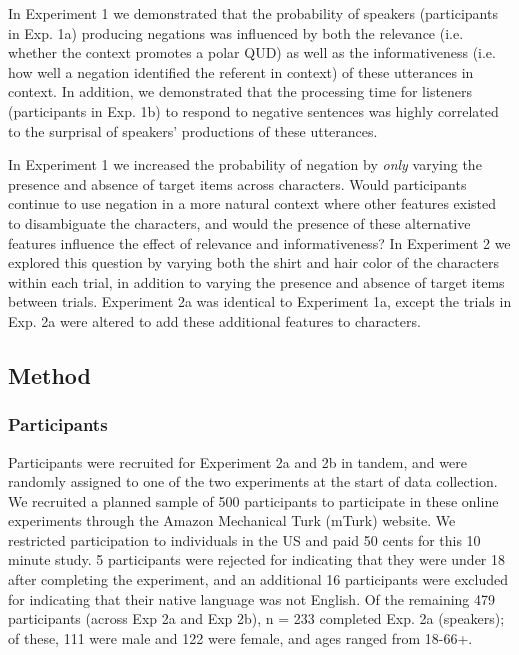 \documentclass[man, floatsintext, noapacite]{apa6}
\begin{document}
In Experiment 1 we demonstrated that the probability of speakers (participants in Exp. 1a) producing negations was influenced by both the relevance (i.e. whether the context promotes a polar QUD) as well as the informativeness (i.e. how well a negation identified the referent in context) of these utterances in context. In addition, we demonstrated that the processing time for listeners (participants in Exp. 1b) to respond to negative sentences was highly correlated to the surprisal of speakers' productions of these utterances. 

In Experiment 1 we increased the probability of negation by \textit{only} varying the presence and absence of target items across characters. Would participants continue to use negation in a more natural context where other features existed to disambiguate the characters, and would the presence of these alternative features influence the effect of relevance and informativeness? In Experiment 2 we explored this question by varying both the shirt and hair color of the characters within each trial, in addition to varying the presence and absence of target items between trials. Experiment 2a was identical to Experiment 1a, except the trials in Exp. 2a were altered to add these additional features to characters. 

\subsection{Method}

\subsubsection{Participants} 

Participants were recruited for Experiment 2a and 2b in tandem, and were randomly assigned to one of the two experiments at the start of data collection. We recruited a planned sample of 500 participants to participate in these online experiments through the Amazon Mechanical Turk (mTurk) website. We restricted participation to individuals in the US and paid 50 cents for this 10 minute study. 5 participants were rejected for indicating that they were under 18 after completing the experiment, and an additional 16 participants were excluded for indicating that their native language was not English. Of the remaining 479 participants (across Exp 2a and Exp 2b), n = 233 completed Exp. 2a (speakers); of these, 111 were male and 122 were female, and ages ranged from 18-66+. 
\end{document}
